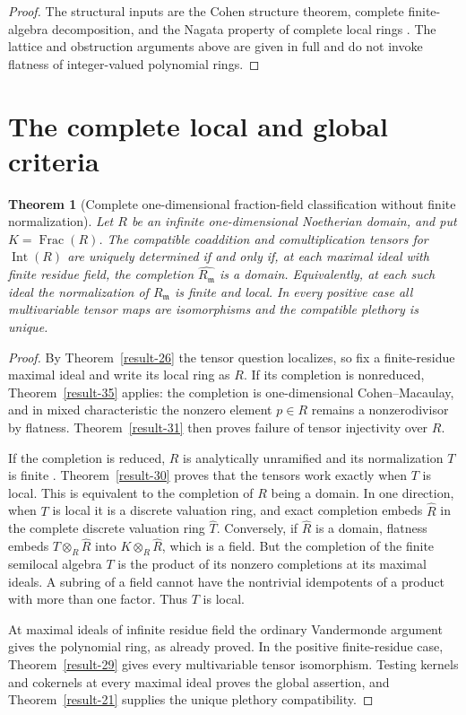\documentclass[11pt,a4paper]{article}
\newtheorem{theorem}{Theorem}[section]
\theoremstyle{definition}
\begin{document}
\begin{proof}
The structural inputs are the Cohen structure theorem,
complete finite-algebra decomposition, and the Nagata property of
complete local rings \cite[Theorem 10.160.8, Lemmas 10.160.2 and
10.162.8; tags 032A, 0325, 032W]{StacksCompletionAnalytic}. The lattice and obstruction arguments above are
given in full and do not invoke flatness of integer-valued
polynomial rings.
\end{proof}

\section{The complete local and global criteria}
\begin{theorem}[Complete one-dimensional fraction-field classification without finite normalization]\label{result-36}
Let $R$ be an infinite one-dimensional Noetherian domain,
and put $K=\operatorname{Frac}(R)$.
The compatible coaddition and comultiplication tensors for
$\operatorname{Int}(R)$ are uniquely determined if and only
if, at each maximal ideal with finite residue field,
the completion $\widehat{R_{\mathfrak m}}$ is a domain.
Equivalently, at each such ideal the normalization of
$R_{\mathfrak m}$ is finite and local. In every positive
case all multivariable tensor maps are isomorphisms and
the compatible plethory is unique.
\end{theorem}
\begin{proof}
By Theorem~\ref{result-26} the tensor question localizes, so fix a
finite-residue maximal ideal and write its local ring
as $R$. If its completion is nonreduced, Theorem~\ref{result-35} applies:
the completion is one-dimensional Cohen--Macaulay, and
in mixed characteristic the nonzero element $p\in R$
remains a nonzerodivisor by flatness. Theorem~\ref{result-31} then proves
failure of tensor injectivity over $R$.

If the completion is reduced, $R$ is analytically
unramified and its normalization $T$ is finite
\cite[Lemma 10.162.10(4), tag 032Y]{StacksCompletionAnalytic}. Theorem~\ref{result-30} proves that the tensors work exactly
when $T$ is local. This is equivalent to the completion
of $R$ being a domain. In one direction, when $T$ is
local it is a discrete valuation ring, and exact
completion embeds $\widehat R$ in the complete discrete
valuation ring $\widehat T$. Conversely, if
$\widehat R$ is a domain, flatness embeds
$T\otimes_R\widehat R$ into
$K\otimes_R\widehat R$, which is a field. But the
completion of the finite semilocal algebra $T$ is the
product of its nonzero completions at its maximal
ideals. A subring of a field cannot have the nontrivial
idempotents of a product with more than one factor.
Thus $T$ is local.

At maximal ideals of infinite residue field the ordinary
Vandermonde argument gives the polynomial ring, as
already proved. In the positive finite-residue case,
Theorem~\ref{result-29} gives every multivariable tensor isomorphism.
Testing kernels and cokernels at every maximal ideal
proves the global assertion, and Theorem~\ref{result-21} supplies the
unique plethory compatibility.
\end{proof}
\end{document}
